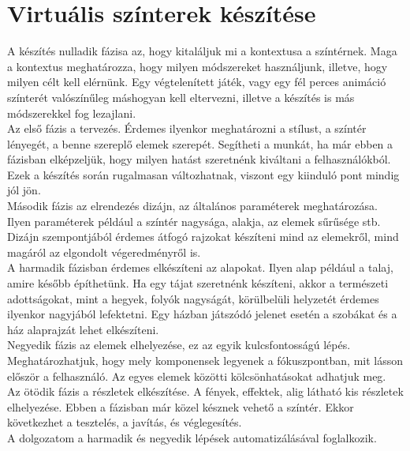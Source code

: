 \section{Virtuális színterek készítése}
A készítés nulladik fázisa az, hogy kitaláljuk mi a kontextusa a színtérnek. Maga a
kontextus meghatározza, hogy milyen módszereket használjunk, illetve, hogy milyen célt kell
elérnünk. Egy végtelenített játék, vagy egy fél perces animáció színterét valószínűleg máshogyan kell
eltervezni, illetve a készítés is más módszerekkel fog lezajlani.\\
Az első fázis a tervezés. Érdemes ilyenkor meghatározni a stílust, a színtér lényegét, a benne szereplő elemek szerepét. Segítheti a munkát, ha már ebben a fázisban elképzeljük, hogy milyen hatást
szeretnénk kiváltani a felhasználókból. Ezek a készítés során rugalmasan változhatnak, viszont egy
kiinduló pont mindig jól jön.\\
Második fázis az elrendezés dizájn, az általános paraméterek meghatározása. Ilyen paraméterek
például a színtér nagysága, alakja, az elemek sűrűsége stb. Dizájn szempontjából érdemes átfogó
rajzokat készíteni mind az elemekről, mind magáról az elgondolt végeredményről is.\\
A harmadik fázisban érdemes elkészíteni az alapokat. Ilyen alap például a talaj, amire később
építhetünk. Ha egy tájat szeretnénk készíteni, akkor a természeti adottságokat, mint a hegyek, folyók
nagyságát, körülbelüli helyzetét érdemes ilyenkor nagyjából lefektetni. Egy házban játszódó jelenet
esetén a szobákat és a ház alaprajzát lehet elkészíteni.\\
Negyedik fázis az elemek elhelyezése, ez az egyik kulcsfontosságú lépés. Meghatározhatjuk, hogy
mely komponensek legyenek a fókuszpontban, mit lásson először a felhasználó. Az egyes elemek
közötti kölcsönhatásokat adhatjuk meg.\\
Az ötödik fázis a részletek elkészítése. A fények, effektek, alig látható kis részletek elhelyezése. Ebben a fázisban már közel késznek vehető a színtér. Ekkor következhet a tesztelés, a javítás, és
véglegesítés.\\
A dolgozatom a harmadik és negyedik lépések automatizálásával foglalkozik.

